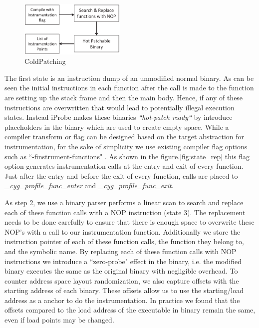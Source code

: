 \begin{figure}[hbt]
  \begin{center}
    \includegraphics[width=0.45\textwidth]{Images/coldpatch.eps}
    \caption{ColdPatching }
    \label{fig:coldpatch}
  \end{center}
\end{figure}

The first state is an instruction dump of an unmodified normal binary. As can be seen the initial instructions in each function after the call is made to the function are setting up the stack frame and then the main body. Hence, if any of these instructions are overwritten that would lead to potentially illegal execution states. Instead iProbe makes these binaries \textit{``hot-patch ready``} by introduce placeholders in the binary which are used to create empty space. While a compiler transform or flag can be designed based on the target abstraction for instrumentation, for the sake of simplicity we use existing compiler flag options such as ``-finstrument-functions" \cite{gcc_codegen}. As shown in the figure.\ref{fig:state_rep} this flag option generates instrumentation calls at the entry and exit of every function. Just after the entry and before the exit of every function, calls are placed to \emph{\_cyg\_profile\_func\_enter} and \emph{\_cyg\_profile\_func\_exit}. 

As step 2, we use a binary parser performs a linear scan to search and replace each of these function calls with a NOP instruction (state 3). The replacement needs to be done carefully to ensure that there is enough space to overwrite these NOP's with a call to our instrumentation function. Additionally we store the instruction pointer of each of these function calls, the function they belong to, and the symbolic name. By replacing each of these function calls with NOP instructions we introduce a ``zero-probe" effect in the binary, i.e. the modified binary executes the same as the original binary with negligible overhead.
To counter address space layout randomization, we also capture offsets with the starting address of each binary. 
These offsets allow us to use the starting/load address as a anchor to do the instrumentation. In practice we found that the offsets compared to the load address of the executable in binary remain the same, even if load points may be changed.

